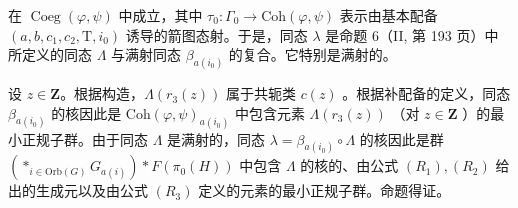 在 \(\operatorname{Coeg}(\varphi,\psi)\) 中成立，其中 \(\tau_{0}\colon\Gamma_{0}\to\mathrm{Coh}(\varphi,\psi)\) 表示由基本配备 \((a,b,c_{1},c_{2},\mathrm{T},i_{0})\) 诱导的箭图态射。于是，同态 \(\lambda\) 是命题 6（II, 第 193 页）中所定义的同态 \(\Lambda\) 与满射同态 \(\beta_{a(i_0)}\) 的复合。它特别是满射的。

设 \(z \in \mathbf{Z}\)。根据构造，\(\Lambda(r_3(z))\) 属于共轭类 \(c(z)\) 。根据补配备的定义，同态 \(\beta_{a(i_0)}\) 的核因此是 \(\mathrm{Coh}(\varphi, \psi)_{a(i_0)}\) 中包含元素 \(\Lambda(r_3(z))\) （对 \(z \in \mathbf{Z}\) ）的最小正规子群。由于同态 \(\Lambda\) 是满射的，同态 \(\lambda = \beta_{a(i_0)} \circ \Lambda\) 的核因此是群 \(\left( *_{i \in \mathrm{Orb}(G)} G_{a(i)} \right) * F(\pi_0(H))\) 中包含 \(\Lambda\) 的核的、由公式 \((R_1), (R_2)\) 给出的生成元以及由公式 \((R_3)\) 定义的元素的最小正规子群。命题得证。

